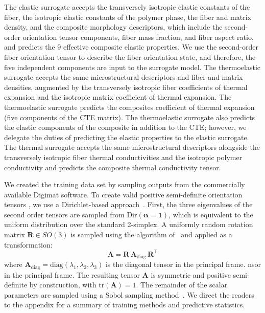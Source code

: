 \documentclass[preprint,review,10pt,number]{elsarticle}
\begin{document}
The elastic surrogate accepts the transversely isotropic elastic constants of the fiber, the isotropic elastic constants of the polymer phase, the fiber and matrix density, and the composite morphology descriptors, which include the second-order orientation tensor components, fiber mass fraction, and fiber aspect ratio, and predicts the 9 effective composite elastic properties.
We use the second-order fiber orientation tensor \cite{advani1987use} to describe the fiber orientation state, and therefore, the five independent components are input to the surrogate model.
The thermoelastic surrogate accepts the same microstructural descriptors and fiber and matrix densities, augmented by the transversely isotropic fiber coefficients of thermal expansion and the isotropic matrix coefficient of thermal expansion.
The thermoelastic surrogate predicts the composites coefficient of thermal expansion (five components of the CTE matrix). 
The thermoelastic surrogate also predicts the elastic components of the composite in addition to the CTE; however, we delegate the duties of predicting the elastic properties to the elastic surrogate.
The thermal surrogate accepts the same microstructural descriptors alongside the transversely isotropic fiber thermal conductivities and the isotropic polymer conductivity and predicts the composite thermal conductivity tensor.

We created the training data set by sampling outputs from the commercially available Digimat software.
To create  valid positive semi-definite orientation tensors \cite{advani1987use}, we use a Dirichlet-based 
approach~\cite{friemann2023micromechanics}.
First, the three eigenvalues of the second order tensors are sampled from $\text{Dir}(\boldsymbol{\alpha} = \mathbf{1})$, which is equivalent to the uniform distribution over the standard 2-simplex.
A uniformly random rotation matrix $\mathbf{R} \in SO(3)$ is sampled using the algorithm 
of~\citet{arvo1992fast} and applied as a transformation:
%
\begin{equation}
    \mathbf{A} = \mathbf{R} \, \mathbf{A}_{\text{diag}} \, \mathbf{R}^\top
    \label{eq:rotation}
\end{equation}
%
where $\mathbf{A}_{\text{diag}} = \text{diag}(\lambda_1, \lambda_2, \lambda_3)$ is the diagonal tensor in the principal frame.
nsor in the principal frame. The resulting tensor $\mathbf{A}$ 
is symmetric and positive semi-definite by construction, with 
$\text{tr}(\mathbf{A}) = 1$.
The remainder of the scalar parameters are sampled using a Sobol sampling method~\cite{sobol1967}.
We direct the readers to the appendix for a summary of training methods and predictive statistics.
\end{document}
